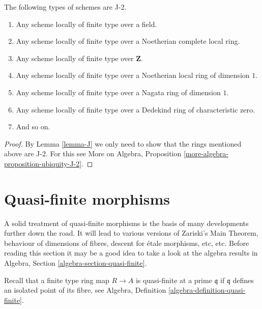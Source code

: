 \begin{lemma}
\label{lemma-ubiquity-J-2}
The following types of schemes are J-2.
\begin{enumerate}
\item Any scheme locally of finite type over a field.
\item Any scheme locally of finite type over a Noetherian complete local ring.
\item Any scheme locally of finite type over $\mathbf{Z}$.
\item Any scheme locally of finite type over a Noetherian local ring
of dimension $1$.
\item Any scheme locally of finite type over a Nagata ring of dimension $1$.
\item Any scheme locally of finite type over a Dedekind ring of
characteristic zero.
\item And so on.
\end{enumerate}
\end{lemma}

\begin{proof}
By Lemma \ref{lemma-J} we only need to show that
the rings mentioned above are J-2. For this see
More on Algebra, Proposition \ref{more-algebra-proposition-ubiquity-J-2}.
\end{proof}



\section{Quasi-finite morphisms}
\label{section-quasi-finite}

\noindent
A solid treatment of quasi-finite morphisms is the basis of many developments
further down the road. It will lead to various versions of Zariski's Main
Theorem, behaviour of dimensions of fibres, descent for \'etale morphisms, etc,
etc. Before reading this section it may be a good idea to take a look at
the algebra results in Algebra, Section \ref{algebra-section-quasi-finite}.

\medskip\noindent
Recall that a finite type ring map $R \to A$ is quasi-finite at
a prime $\mathfrak q$ if $\mathfrak q$ defines an isolated point
of its fibre, see Algebra, Definition \ref{algebra-definition-quasi-finite}.

